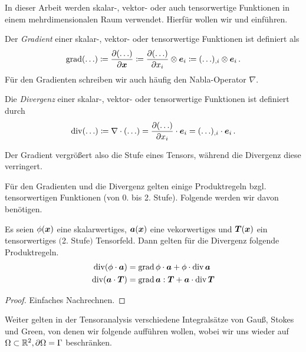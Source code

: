 In dieser Arbeit werden skalar-, vektor- oder auch tensorwertige Funktionen in einem mehrdimensionalen Raum verwendet. Hierfür wollen wir  und  einführen.

\begin{defi}\label{def:C.10}
Der \textit{Gradient} einer  skalar-, vektor- oder  tensorwertige Funktionen ist definiert als
\[
	\operatorname{grad}(\ldots) \coloneqq \frac{\partial(\ldots)}{\partial\boldsymbol x} \coloneqq \frac{\partial(\ldots)}{\partial x_i}\otimes \boldsymbol e_i \coloneqq (\ldots)_{,i} \otimes \boldsymbol e_i \, . 
\]
Für den Gradienten schreiben wir auch häufig den Nabla-Operator $\nabla$.

Die \textit{Divergenz} einer skalar-, vektor- oder  tensorwertige Funktionen ist definiert durch
\[
	\operatorname{div} (\ldots) \coloneqq \nabla \cdot (\ldots) = \frac{\partial(\ldots)}{\partial x_i}\cdot \boldsymbol e_i = (\ldots)_{,i} \cdot \boldsymbol e_i \, .
\]
\end{defi}

\begin{bem*}
Der Gradient vergrößert also die Stufe eines Tensors, während die Divergenz diese verringert.
\end{bem*}

Für den Gradienten und die Divergenz gelten einige Produktregeln bzgl. tensorwertigen Funktionen (von 0. bis 2. Stufe). Folgende werden wir davon benötigen.

\begin{satz}\label{satz:C.11}
Es seien $\phi(\boldsymbol x)$ eine skalarwertiges, $\boldsymbol a(\boldsymbol x)$ eine vekorwertiges und $\boldsymbol T(\boldsymbol x)$ ein tensorwertiges $($2. Stufe$)$ Tensorfeld. Dann gelten für die Divergenz folgende Produktregeln.
\begin{align}\label{eq:C.1}
	\operatorname{div} (\phi \cdot \boldsymbol a ) &= \operatorname{grad} \phi \cdot \boldsymbol a + \phi \cdot \operatorname{div} \boldsymbol a \\
	\label{eq:C.2}
	\operatorname{div} (\boldsymbol a \cdot \boldsymbol T) &= \operatorname{grad} \boldsymbol a : \boldsymbol T + \boldsymbol a \cdot \operatorname{div} \boldsymbol T 
\end{align}
\end{satz}

\begin{proof}
Einfaches Nachrechnen.
\end{proof}


Weiter gelten in der Tensoranalysis verschiedene Integralsätze von Gauß, Stokes und Green, von denen wir folgende aufführen wollen, wobei wir uns wieder auf $\Omega \subset \mathbb{R}^2, \partial\Omega = \Gamma$ beschränken.

